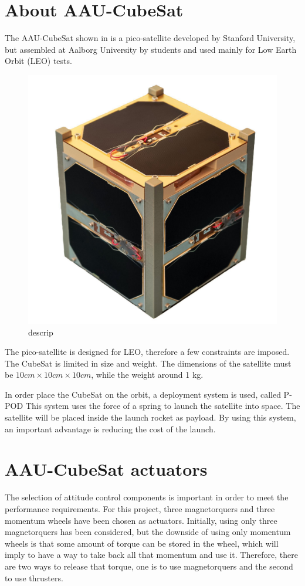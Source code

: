 \section{About AAU-CubeSat}
The AAU-CubeSat shown in  is a pico-satellite developed by Stanford University, but assembled at Aalborg University by students and used mainly for Low Earth Orbit (LEO)  tests.
\begin{figure}[H]
	\centering
	\includegraphics[width=0.3\linewidth]{figures/aau_cubsat}
	\caption{descrip}
	\label{fig:pico}
\end{figure}
The pico-satellite is designed for LEO, therefore a few constraints are imposed. The CubeSat is limited in size and weight. The dimensions of the satellite must be $10cm\times10cm\times10cm$, while the weight around 1 kg. 

In order place the CubeSat on the orbit, a deployment system is used, called P-POD  This system uses the force of a spring to launch the satellite into space. The satellite will be placed inside the launch rocket as payload. By using this system, an important advantage is reducing the cost of the launch.
%
\section{AAU-CubeSat actuators}
The selection of attitude control components is important in order to meet the performance requirements. For this project, three magnetorquers and three momentum wheels have been chosen as actuators. Initially, using only three magnetorquers has been considered, but the downside of using only momentum wheels is that some amount of torque can be stored in the wheel, which will imply to have a way to take back all that momentum and use it. Therefore, there are two ways to release that torque, one is to use magnetorquers and the second to use thrusters. 

